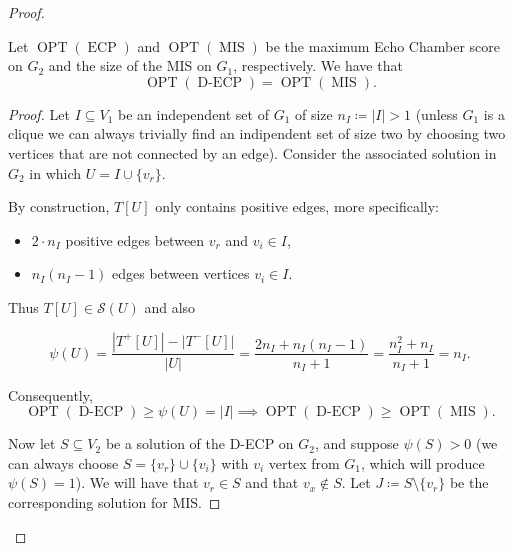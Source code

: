 \begin{proof}
	\begin{claim}
		\label{th:opt-equality-densest}
		Let $\operatorname{OPT}(\operatorname{ECP})$ and
		$\operatorname{OPT}(\operatorname{MIS})$ be the maximum Echo Chamber score on
		$G_2$ and the size of the MIS on $G_1$, respectively.
		We have that
		\begin{equation}
			\operatorname{OPT}(\operatorname{D-ECP}) =
			\operatorname{OPT}(\operatorname{MIS}).
		\end{equation}
	\end{claim}

	\begin{proof}
		Let $I \subseteq V_{1} $ be an independent set of $G_1$ of size $n_{I}
			\coloneqq |I| > 1$ (unless $G_1$ is a clique we can always trivially find an indipendent set of
		size two by choosing two vertices that are not
		connected by an edge). Consider the associated solution in $G_2$ in
		which $U = I \cup \{v_{r} \}$.

		By construction, $T[U]$ only contains positive edges, more
		specifically:
		\begin{itemize}
			\item $2 \cdot n_{I} $ positive edges between $v_{r} $ and $v_{i}
				      \in I$,
			\item $n_{I}(n_{I}  -1)$
			      edges between vertices $v_{i} \in I$.

		\end{itemize}
		Thus $T[U] \in \mathcal{S}(U)$ and also

		\begin{equation}
			\label{eq:score-densest-mip}
			\psi(U) = \frac{|T^{+}[U]| - |T^{-}[U]|}{|U|}  = \frac{2n_{I}  +
				n_{I}(n_{I}  -1) }{n_{I} + 1} = \frac{n_{I}^{2} +
				n_{I}}{n_{I} + 1} = n_{I}.
		\end{equation}

		Consequently,
		\begin{equation}
			\operatorname{OPT}(\operatorname{D-ECP}) \geq \psi(U) = |I|
			\implies \operatorname{OPT}(\operatorname{D-ECP}) \geq
			\operatorname{OPT}(\operatorname{MIS}).
		\end{equation}

		Now let $S \subseteq V_2$ be a solution of the \acrshort{D-ECP} on
		$G_2$, and suppose $\psi(S) > 0$ (we can always choose $S = \{ v_r \}
			\cup \{ v_i\}$ with $v_i$ vertex from $G_1$, which will produce
		$\psi(S) = 1$). We will have that
		$v_{r} \in S$ and that $v_{x} \not\in S $. Let $J \coloneqq S \setminus
			\{v_r\}$ be the corresponding solution for MIS.


\end{proof}
\end{proof}
